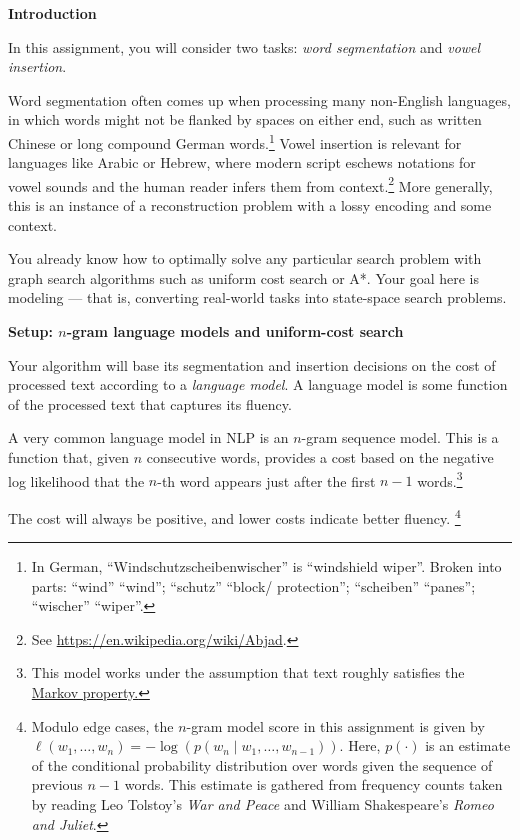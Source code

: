 {\bf Introduction}

In this assignment, you will consider two tasks: {\em word segmentation} and {\em vowel
insertion}.

Word segmentation often comes up when processing many non-English languages, in
which words might not be flanked by spaces on either end, such as written
Chinese or long compound German words.\footnote{In German,
``Windschutzscheibenwischer'' is ``windshield wiper''. Broken into parts:
``wind'' \textrightarrow ``wind''; ``schutz'' \textrightarrow ``block/
protection''; ``scheiben'' \textrightarrow ``panes''; ``wischer''
\textrightarrow ``wiper''.} Vowel insertion is relevant for languages like
Arabic or Hebrew, where modern script eschews notations for vowel sounds and the
human reader infers them from context.\footnote{See
\url{https://en.wikipedia.org/wiki/Abjad}.} More generally, this is an instance
of a reconstruction problem with a lossy encoding and some context.

You already know how to optimally solve any particular search problem with graph
search algorithms such as uniform cost search or A*.  Your goal here is modeling
--- that is, converting real-world tasks into state-space search problems.

{\bf Setup: $n$-gram language models and uniform-cost search}

Your algorithm will base its segmentation and insertion decisions on the cost of
processed text according to a {\em language model}. A language model is some
function of the processed text that captures its fluency.

A very common language model in NLP is an $n$-gram sequence model. This is a
function that, given $n$ consecutive words, provides a cost based on the
negative log likelihood that the $n$-th word appears just after the first $n-1$
words.\footnote{This model works under the assumption that text roughly
satisfies the \href{https://en.wikipedia.org/wiki/Markov_property}{Markov
 property.}}

The cost will always be positive, and lower costs indicate better fluency.
\footnote{Modulo edge cases, the $n$-gram model score in this assignment is
given by $\ell(w_1, \ldots, w_n) = -\log(p(w_n \mid w_1, \ldots, w_{n-1}))$.
Here, $p(\cdot)$ is an estimate of the conditional probability distribution over
words given the sequence of previous $n-1$ words.  This estimate is gathered
from frequency counts taken by reading Leo Tolstoy's {\em War and Peace} and
William Shakespeare's {\em Romeo and Juliet}.}

